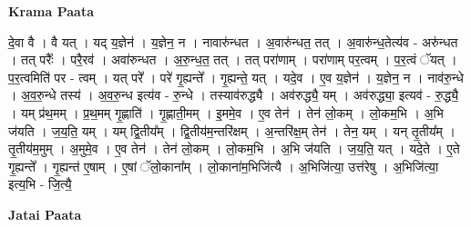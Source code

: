 \documentclass[17pt]{extarticle}
\begin{document}
\textbf{Krama Paata} \newline

दे॒वा वै । वै यत् । यद् य॒ज्ञेन॑ । य॒ज्ञेन॒ न । नावारु॑न्धत । अ॒वारु॑न्धत॒ तत् । अ॒वारु॑न्ध॒तेत्य॑व - अरु॑न्धत । तत् परैः᳚ । परै॒रव॑ । अवा॑रुन्धत । अ॒रु॒न्ध॒त॒ तत् । तत् परा॑णाम् । परा॑णाम् पर॒त्वम् । प॒र॒त्वं ॅयत् । प॒र॒त्वमिति॑ पर - त्वम् । यत् परे᳚ । परे॑ गृ॒ह्यन्ते᳚ । गृ॒ह्यन्ते॒ यत् । यदे॒व । ए॒व य॒ज्ञेन॑ । य॒ज्ञेन॒ न । नाव॑रु॒न्धे । अ॒व॒रु॒न्धे तस्य॑ । अ॒व॒रु॒न्ध इत्य॑व - रु॒न्धे । तस्याव॑रुद्ध्यै । अव॑रुद्ध्यै॒ यम् । अव॑रुद्ध्या॒ इत्यव॑ - रु॒द्ध्यै॒ । यम् प्र॑थ॒मम् । प्र॒थ॒मम् गृ॒ह्णाति॑ । गृ॒ह्णाती॒मम् । इ॒ममे॒व । ए॒व तेन॑ । तेन॑ लो॒कम् । लो॒कम॒भि । अ॒भि ज॑यति । ज॒य॒ति॒ यम् । यम् द्वि॒तीय᳚म् । द्वि॒तीय॑म॒न्तरि॑क्षम् । अ॒न्तरि॑क्ष॒म् तेन॑ । तेन॒ यम् । यन् तृ॒तीय᳚म् । तृ॒तीय॑म॒मुम् । अ॒मुमे॒व । ए॒व तेन॑ । तेन॑ लो॒कम् । लो॒कम॒भि । अ॒भि ज॑यति । ज॒य॒ति॒ यत् । यदे॒ते । ए॒ते गृ॒ह्यन्ते᳚ । गृ॒ह्यन्त॑ ए॒षाम् । ए॒षां ॅलो॒काना᳚म् । लो॒काना॑म॒भिजि॑त्यै । अ॒भिजि॑त्या॒ उत्त॑रेषु । अ॒भिजि॑त्या॒ इत्य॒भि - जि॒त्यै॒ \newline

\textbf{Jatai Paata} \newline
\end{document}
